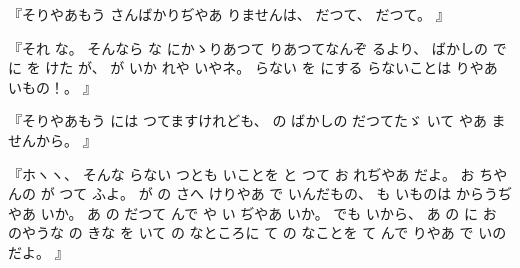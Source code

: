 『そりやあもう
さんばかりぢやあ
りませんは、
%
だつて、
%
だつて。
』

『それ
な。
%
そんなら
な
にかゝりあつて
りあつてなんぞ
るより、
%
ばかしの
で%
に
を
けた
が、
%
が
いか
れや
いやネ。
%
らない
を
にする
らないことは
りやあ
いもの！。
』

『そりやあもう
には
つてますけれども、
%
の
ばかしの
だつてたゞ
いて
やあ
ませんから。
』

『ホヽヽ、
%
そんな
らない
つとも
いことを
と
つて
お
れぢやあ
だよ。
%
お
ちやんの
が
つて
ふよ。
%
が
の
さへ
けりやあ
で
いんだもの、
%
も
いものは
からうぢやあ
いか。
%
あ
の
だつて
んで
や
い
ぢやあ
いか。
%
でも
いから、
%
あ
の
に
お
のやうな
の
きな
を
いて
の
なところに
て
の
なことを
て
んで
りやあ
で
いのだよ。
』
